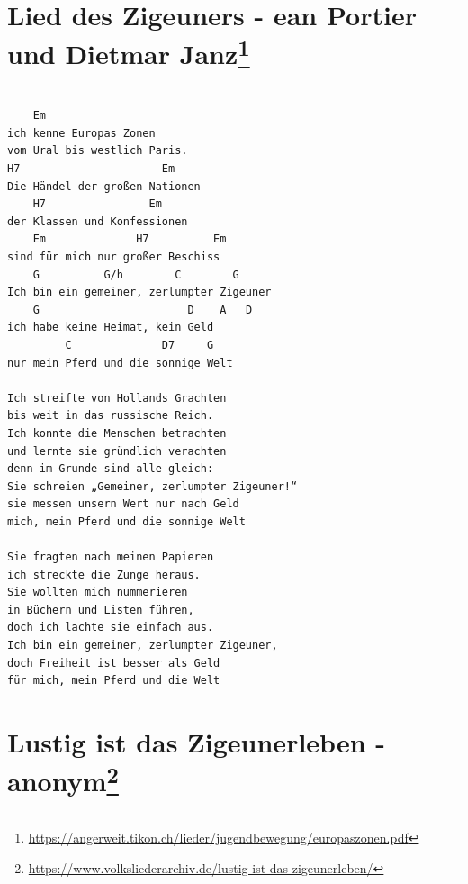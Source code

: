 \documentclass[
]{book}
\let\stdsection\section
\renewcommand\section{\clearpage\stdsection}
\begin{document}
\hypertarget{volkslieder-ich-kenne-europas-zonen}{%
\section[Lied des Zigeuners - ean Portier und Dietmar Janz]{\texorpdfstring{Lied des Zigeuners - ean Portier und Dietmar Janz\footnote{\url{https://angerweit.tikon.ch/lieder/jugendbewegung/europaszonen.pdf}}}{Lied des Zigeuners - ean Portier und Dietmar Janz}}\label{volkslieder-ich-kenne-europas-zonen}}

\begin{verbatim}

    Em
ich kenne Europas Zonen
vom Ural bis westlich Paris.
H7                      Em
Die Händel der großen Nationen
    H7                Em
der Klassen und Konfessionen
    Em              H7          Em   
sind für mich nur großer Beschiss
    G          G/h        C        G
Ich bin ein gemeiner, zerlumpter Zigeuner
    G                       D    A   D
ich habe keine Heimat, kein Geld
         C              D7     G
nur mein Pferd und die sonnige Welt

Ich streifte von Hollands Grachten
bis weit in das russische Reich.
Ich konnte die Menschen betrachten
und lernte sie gründlich verachten
denn im Grunde sind alle gleich:
Sie schreien „Gemeiner, zerlumpter Zigeuner!“
sie messen unsern Wert nur nach Geld
mich, mein Pferd und die sonnige Welt

Sie fragten nach meinen Papieren
ich streckte die Zunge heraus.
Sie wollten mich nummerieren
in Büchern und Listen führen,
doch ich lachte sie einfach aus.
Ich bin ein gemeiner, zerlumpter Zigeuner,
doch Freiheit ist besser als Geld
für mich, mein Pferd und die Welt
\end{verbatim}

\hypertarget{volkslieder-lustig-ist-das-zigeunerleben}{%
\section[Lustig ist das Zigeunerleben - anonym]{\texorpdfstring{Lustig ist das Zigeunerleben - anonym\footnote{\url{https://www.volksliederarchiv.de/lustig-ist-das-zigeunerleben/}}}{Lustig ist das Zigeunerleben - anonym}}\label{volkslieder-lustig-ist-das-zigeunerleben}}
\end{document}
